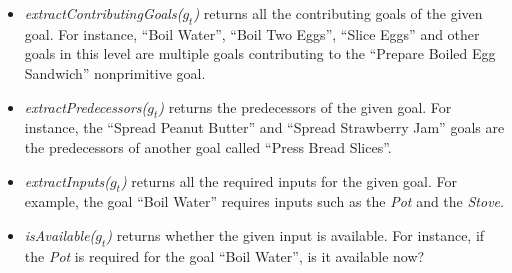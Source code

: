 \documentclass{article}
\begin{document}
\begin{itemize}[leftmargin=2pt]
  
  
  
  
  \item \textit{extractContributingGoals($g_t$)} returns all the contributing
  goals of the given goal. For instance, ``Boil Water'', ``Boil Two Eggs'',
  ``Slice Eggs'' and other goals in this level are multiple goals contributing
  to the ``Prepare Boiled Egg Sandwich'' nonprimitive goal.
  
  \item \textit{extractPredecessors($g_t$)} returns the predecessors of the
  given goal. For instance, the ``Spread Peanut Butter'' and ``Spread
  Strawberry Jam'' goals are the predecessors of another goal called ``Press
  Bread Slices''.
  
  \item \textit{extractInputs($g_t$)} returns all the required inputs for
  the given goal. For example, the goal ``Boil Water'' requires inputs such as
  the \textit{Pot} and the \textit{Stove}.
  
  \item \textit{isAvailable($g_t$)} returns whether the given input is
  available. For instance, if the \textit{Pot} is required for the goal
  ``Boil Water'', is it available now?
  
  

\end{itemize}
\end{document}

